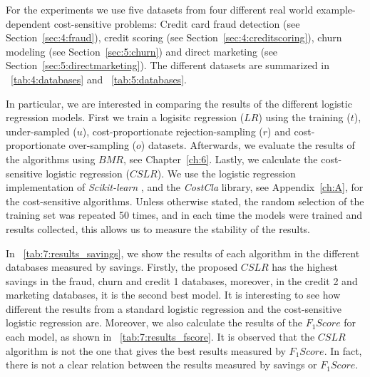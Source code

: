 For the experiments we use five datasets from four different real world example-dependent 
cost-sensitive problems: Credit card fraud detection (see Section~\ref{sec:4:fraud}), credit 
scoring (see Section~\ref{sec:4:creditscoring}), churn modeling (see Section~\ref{sec:5:churn}) and 
direct marketing (see Section~\ref{sec:5:directmarketing}). The different datasets are summarized 
in \tablename{~\ref{tab:4:databases}} and \tablename{~\ref{tab:5:databases}}.

In particular, we are interested in comparing the results of the different logistic regression 
models. First we train a logisitc regression ($LR$) using the training ($t$), under-sampled 
($u$), cost-proportionate rejection-sampling  ($r$) \citep{Zadrozny2003}  and  cost-proportionate 
over-sampling ($o$) \citep{Elkan2001} datasets. Afterwards,  we evaluate the results of  the 
algorithms using $BMR$, see Chapter~\ref{ch:6}. Lastly, we calculate the cost-sensitive 
logistic  regression ($CSLR$). We use the logistic regression implementation of
\textit{Scikit-learn} \citep{Pedregosa2011}, and the \textit{CostCla} library, see 
Appendix~\ref{ch:A}, for the cost-sensitive algorithms. Unless otherwise stated, the random 
selection of the training set was repeated 50 times, and in each time the models were trained and 
results collected, this allows us to measure the stability of the results.
  
In \tablename{~\ref{tab:7:results_savings}}, we show the results of each algorithm in the different 
databases measured by savings. Firstly, the proposed $CSLR$ has the highest savings in the 
fraud, churn and credit 1 databases, moreover, in the credit 2 and marketing databases, it 
is the second best model. It is interesting to see how different the results from a standard 
logistic regression and the cost-sensitive logistic 
regression are. Moreover, we also calculate the results of the $F_1Score$ for each model, as 
shown in \tablename{~\ref{tab:7:results_fscore}}. It is observed that the $CSLR$ algorithm is not 
the one that gives the best results measured by $F_1Score$. In fact, there is not a clear relation 
between the results measured by savings or  $F_1Score$.

